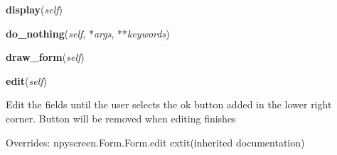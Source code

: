     \label{npyscreen:Form:Form:display}
    
    \vspace{0.5ex}

    \begin{boxedminipage}{\textwidth}

    \raggedright \textbf{display}(\textit{self})

    \end{boxedminipage}

    \label{npyscreen:Form:Form:do_nothing}
    
    \vspace{0.5ex}

    \begin{boxedminipage}{\textwidth}

    \raggedright \textbf{do\_nothing}(\textit{self}, *\textit{args}, **\textit{keywords})

    \end{boxedminipage}

    \label{npyscreen:Form:Form:draw_form}
    
    \vspace{0.5ex}

    \begin{boxedminipage}{\textwidth}

    \raggedright \textbf{draw\_form}(\textit{self})

    \end{boxedminipage}

    \vspace{0.5ex}

    \begin{boxedminipage}{\textwidth}

    \raggedright \textbf{edit}(\textit{self})

    Edit the fields until the user selects the ok button added in the lower
    right corner. Button will be removed when editing finishes

    \vspace{1ex}

      Overrides: npyscreen.Form.Form.edit 	extit{(inherited documentation)}

    \end{boxedminipage}

    \label{npyscreen:ActionForm':ActionForm:find_cancel_button}

